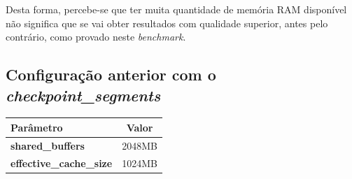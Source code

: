 Desta forma, percebe-se que ter muita quantidade de memória RAM disponível não significa que se vai obter resultados com qualidade superior, antes pelo contrário, como provado neste \textit{benchmark}.

\subsection{Configuração anterior com o \textit{checkpoint\_segments}}


\begin{table}[!h]
\center
\small
\begin{tabular}{|l|c|}
\hline
\textbf{Parâmetro} & \textbf{Valor} \\ \hline
\textbf{shared\_buffers} & 2048MB  \\ \hline
\textbf{effective\_cache\_size} & 1024MB  \\ \hline
\end{tabular}
\end{table}
